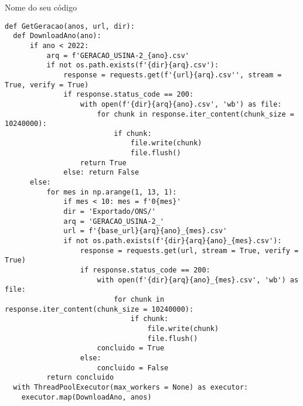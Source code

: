 \begin{codigo}[htbp]
\caption{Nome do seu código}
\begin{verbatim}
def GetGeracao(anos, url, dir):
  def DownloadAno(ano):
      if ano < 2022:
          arq = f'GERACAO_USINA-2_{ano}.csv'
          if not os.path.exists(f'{dir}{arq}.csv'):
              response = requests.get(f'{url}{arq}.csv'', stream = True, verify = True)
              if response.status_code == 200:
                  with open(f'{dir}{arq}{ano}.csv', 'wb') as file:
                      for chunk in response.iter_content(chunk_size = 10240000):
                          if chunk:
                              file.write(chunk)
                              file.flush()
                  return True
              else: return False
      else:
          for mes in np.arange(1, 13, 1):
              if mes < 10: mes = f'0{mes}'
              dir = 'Exportado/ONS/'
              arq = 'GERACAO_USINA-2_'
              url = f'{base_url}{arq}{ano}_{mes}.csv'
              if not os.path.exists(f'{dir}{arq}{ano}_{mes}.csv'):
                  response = requests.get(url, stream = True, verify = True)
                  if response.status_code == 200:
                      with open(f'{dir}{arq}{ano}_{mes}.csv', 'wb') as file:
                          for chunk in response.iter_content(chunk_size = 10240000):
                              if chunk:
                                  file.write(chunk)
                                  file.flush()
                      concluido = True
                  else:
                      concluido = False
          return concluido
  with ThreadPoolExecutor(max_workers = None) as executor:
    executor.map(DownloadAno, anos)
\end{verbatim}
\end{codigo}

\begin{table}[htb]
  \centering
    {
    }
\end{table}


